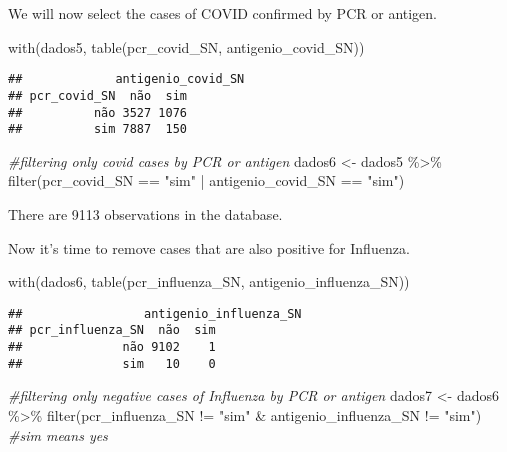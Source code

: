 \documentclass[
]{article}
\newenvironment{Shaded}{\begin{snugshade}}{\end{snugshade}}
\newcommand{\CommentTok}[1]{\textcolor[rgb]{0.56,0.35,0.01}{\textit{#1}}}
\newcommand{\FunctionTok}[1]{\textcolor[rgb]{0.00,0.00,0.00}{#1}}
\newcommand{\NormalTok}[1]{#1}
\newcommand{\OtherTok}[1]{\textcolor[rgb]{0.56,0.35,0.01}{#1}}
\newcommand{\SpecialCharTok}[1]{\textcolor[rgb]{0.00,0.00,0.00}{#1}}
\newcommand{\StringTok}[1]{\textcolor[rgb]{0.31,0.60,0.02}{#1}}
\begin{document}
We will now select the cases of COVID confirmed by PCR or antigen.

\begin{Shaded}
\begin{Highlighting}[]
\FunctionTok{with}\NormalTok{(dados5, }\FunctionTok{table}\NormalTok{(pcr\_covid\_SN, antigenio\_covid\_SN))}
\end{Highlighting}
\end{Shaded}

\begin{verbatim}
##             antigenio_covid_SN
## pcr_covid_SN  não  sim
##          não 3527 1076
##          sim 7887  150
\end{verbatim}

\begin{Shaded}
\begin{Highlighting}[]
\CommentTok{\#filtering only covid cases by PCR or antigen}
\NormalTok{dados6 }\OtherTok{\textless{}{-}}\NormalTok{ dados5 }\SpecialCharTok{\%\textgreater{}\%} 
    \FunctionTok{filter}\NormalTok{(pcr\_covid\_SN }\SpecialCharTok{==} \StringTok{"sim"} \SpecialCharTok{|}\NormalTok{ antigenio\_covid\_SN }\SpecialCharTok{==} \StringTok{"sim"}\NormalTok{)}
\end{Highlighting}
\end{Shaded}

There are 9113 observations in the database.

Now it's time to remove cases that are also positive for Influenza.

\begin{Shaded}
\begin{Highlighting}[]
\FunctionTok{with}\NormalTok{(dados6, }\FunctionTok{table}\NormalTok{(pcr\_influenza\_SN, antigenio\_influenza\_SN))}
\end{Highlighting}
\end{Shaded}

\begin{verbatim}
##                 antigenio_influenza_SN
## pcr_influenza_SN  não  sim
##              não 9102    1
##              sim   10    0
\end{verbatim}

\begin{Shaded}
\begin{Highlighting}[]
\CommentTok{\#filtering only negative cases of Influenza by PCR or antigen}
\NormalTok{dados7 }\OtherTok{\textless{}{-}}\NormalTok{ dados6 }\SpecialCharTok{\%\textgreater{}\%} 
    \FunctionTok{filter}\NormalTok{(pcr\_influenza\_SN }\SpecialCharTok{!=} \StringTok{"sim"} \SpecialCharTok{\&}\NormalTok{ antigenio\_influenza\_SN }\SpecialCharTok{!=} \StringTok{"sim"}\NormalTok{) }\CommentTok{\#\textquotesingle{}sim\textquotesingle{} means \textquotesingle{}yes\textquotesingle{}}
\end{Highlighting}
\end{Shaded}
\end{document}
